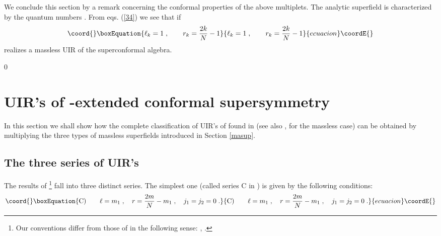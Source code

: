 \documentclass[a4paper,12pt]{article}
\begin{document}
We conclude this section by a remark concerning the conformal 
properties of the above multiplets. The \coordHE{} analytic 
superfield \coordHE{} is characterized by the \coordHE{} 
quantum numbers \coordHE{}. 
{}From eqs. (\ref{34}) we see that if 
\begin{equation}\coord{}\boxEquation{\label{rch}
 \ell_k=1\;, \qquad r_k={2k\over N}-1
}{\ell_k=1\;, \qquad r_k={2k\over N}-1
}{ecuacion}\coordE{}\end{equation}
\coordHE{} realizes a massless UIR of the superconformal 
algebra. 

\setcounter{equation}0 
\section{UIR's of \coordHE{}  \coordHE{}-extended conformal 
supersymmetry}\label{sect5} 

In this section we shall show how the complete classification of 
UIR's of \coordHE{} found in \cite{dp} (see also 
\cite{mss}, \cite{bin} for the massless case) can be obtained by 
multiplying the three types of massless superfields introduced in 
Section \ref{masup}. 

\subsection{The three series of UIR's}\label{3ser} 

The results of \cite{dp} \footnote{Our conventions differ from 
those of \cite{dp} in the following sense: \coordHE{}, 
\coordHE{}.} fall into three distinct 
series. The simplest one (called series C in \cite{FS1}) is given 
by the following conditions: 
\begin{equation}\coord{}\boxEquation{\label{C}
  {\rm C)}\qquad \ell = m_1\;, \quad r={2m\over N}-m_1\;, \quad j_1=j_2=0\;. 
}{{\rm C)}\qquad \ell = m_1\;, \quad r={2m\over N}-m_1\;, \quad j_1=j_2=0\;. 
}{ecuacion}\coordE{}\end{equation} 
\end{document}
